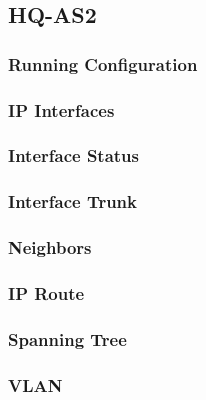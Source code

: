 \subsection{HQ-AS2}
\subsubsection{Running Configuration}


\subsubsection{IP Interfaces}


\subsubsection{Interface Status}


\subsubsection{Interface Trunk}


\subsubsection{Neighbors}


\subsubsection{IP Route}


\subsubsection{Spanning Tree}


\subsubsection{VLAN}





